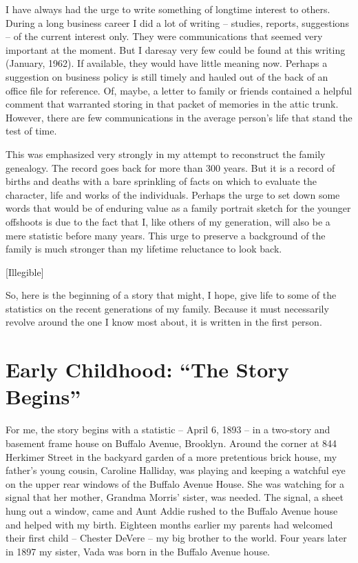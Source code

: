 \documentclass[12pt]{book}              %
\begin{document}
I have always had the urge to write something of longtime interest to others. During a long business career I did a lot of writing -- studies, reports, suggestions -- of the current interest only. They were communications that seemed very important at the moment. But I daresay very few could be found at this writing (January, 1962). If available, they would have little meaning now. Perhaps a suggestion on business policy is still timely and hauled out of the back of an office file for reference. Of, maybe, a letter to family or friends contained a helpful comment that warranted storing in that packet of memories in the attic trunk. However, there are few communications in the average person's life that stand the test of time.

This was emphasized very strongly in my attempt to reconstruct the family genealogy. The record goes back for more than 300 years. But it is a record of births and deaths with a bare sprinkling of facts on which to evaluate the character, life and works of the individuals. Perhaps the urge to set down some words that would be of enduring value as a family portrait sketch for the younger offshoots is due to the fact that I, like others of my generation, will also be a mere statistic before many years. This urge to preserve a background of the family is much stronger than my lifetime reluctance to look back. 

[Illegible]

So, here is the beginning of a story that might, I hope, give life to some of the statistics on the recent generations of my family. Because it must necessarily revolve around the one I know most about, it is written in the first person. 

\chapter{Early Childhood: ``The Story Begins''}

For me, the story begins with a statistic -- April 6, 1893 -- in a two-story and basement frame house on Buffalo Avenue, Brooklyn. Around the corner at 844 Herkimer Street in the backyard garden of a more pretentious brick house, my father's young cousin, Caroline Halliday, was playing and keeping a watchful eye on the upper rear windows of the Buffalo Avenue House. She was watching for a signal that her mother, Grandma Morris' sister, was needed. The signal, a sheet hung out a window, came and Aunt Addie rushed to the Buffalo Avenue house and helped with my birth. Eighteen months earlier my parents had welcomed their first child -- Chester DeVere -- my big brother to the world. Four years later in 1897 my sister, Vada was born in the Buffalo Avenue house.
\end{document}
